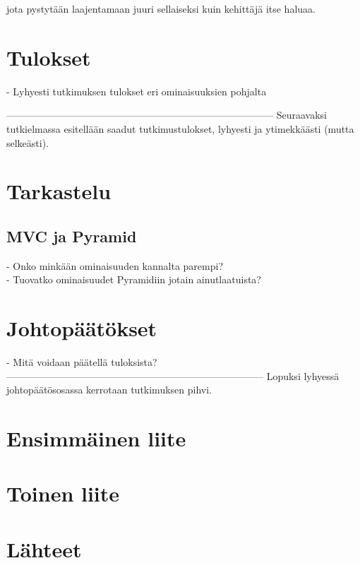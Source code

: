 \documentclass[finnish,utf8,nonumbib,palatino,kandi]{gradu2}
\begin{document}
 jota pystytään laajentamaan juuri sellaiseksi
kuin kehittäjä itse haluaa. 



\section{Tulokset}
- Lyhyesti tutkimuksen tulokset eri ominaisuuksien pohjalta


---------------------------------------------------------------------------------
Seuraavaksi tutkielmassa esitellään saadut tutkimustulokset, lyhyesti
ja ytimekkäästi (mutta selkeästi).

\section{Tarkastelu}
\subsection{MVC ja Pyramid}
- Onko minkään ominaisuuden kannalta parempi? \\
- Tuovatko ominaisuudet Pyramidiin jotain ainutlaatuista?

\section{Johtopäätökset}
- Mitä voidaan päätellä tuloksista?
------------------------------------------------------------------------------
Lopuksi lyhyessä johtopäätösosassa kerrotaan tutkimuksen pihvi.




\appendix
\section{Ensimmäinen liite}
\section{Toinen liite}


\section{Lähteet}
\end{document}

